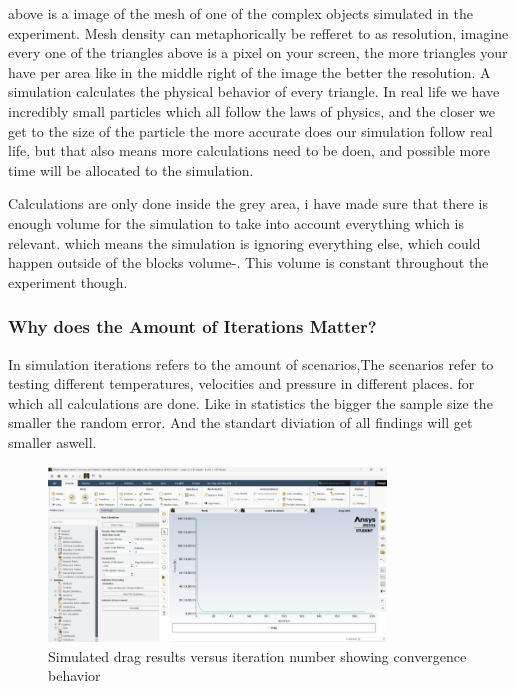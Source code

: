 \documentclass[12pt,a4paper]{article}
\begin{document}
above is a image of the mesh of one of the complex objects simulated in the experiment. Mesh density can metaphorically be refferet to as resolution, imagine every one of the triangles above is a pixel on your screen, the more triangles your have per area like in the middle right of the image the better the resolution. A simulation calculates the physical behavior of every triangle. In real life we have incredibly small particles which all follow the laws of physics, and the closer we get to the size of the particle the more accurate does our simulation follow real life, but that also means more calculations need to be doen, and possible more time will be allocated to the simulation.

Calculations are only done inside the grey area, i have made sure that there is enough volume for the simulation to take into account everything which is relevant. which means the simulation is ignoring everything else, which could happen outside of the blocks volume-. This volume is constant throughout the experiment though.

\subsubsection{Why does the Amount of Iterations Matter?}

In simulation iterations refers to the amount of scenarios,The scenarios refer to testing different temperatures, velocities and pressure in different places. for which all calculations are done. Like in statistics the bigger the sample size the smaller the random error. And the standart diviation of all findings will get smaller aswell. 

\begin{figure}[H]
    \centering
    \includegraphics[width=0.8\textwidth]{image8.png}
    \caption{Simulated drag results versus iteration number showing convergence behavior}
    \label{fig:convergence}
\end{figure}
\end{document}

